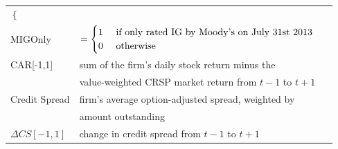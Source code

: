 \documentclass[a4paper, 12pt]{article}
\begin{document}
\begin{table}[htbp]
\begin{footnotesize}
\begin{tabular}{@{}lll@{}}
\begin{math}
\begin{cases}
\end{cases}
\end{math}  \\
MIGOnly & \begin{math}
=
\begin{cases}
 1  & \textnormal{ if only rated IG by Moody's on July 31st 2013 } \\
0 & \textnormal{  otherwise}
\end{cases}
\end{math} \\
CAR[-1,1] & sum of the firm's daily stock return minus the \\  &  value-weighted CRSP market return from $t-1$ to $t+1$   &   \\
Credit Spread & firm's average option-adjusted spread, weighted by &   \\ &
amount outstanding  \\
$\Delta CS[-1,1]$ & change in credit spread from $t-1$ to $t+1$ \\
\hline

\end{tabular}
\end{footnotesize}
\end{table}
\clearpage
\newpage
\end{document}
